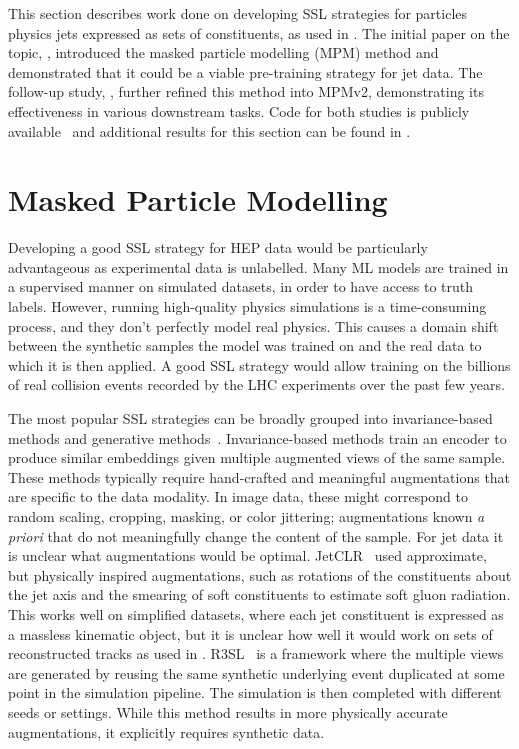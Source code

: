 This section describes work done on developing SSL strategies for particles physics jets expressed as sets of constituents, as used in .
The initial paper on the topic, \textcite{MPM}, introduced the masked particle modelling (MPM) method and demonstrated that it could be a viable pre-training strategy for jet data.
The follow-up study, \textcite{MPM2}, further refined this method into MPMv2, demonstrating its effectiveness in various downstream tasks.
Code for both studies is publicly available~\cite{MPMCode, MPM2Code} and additional results for this section can be found in .

\section{Masked Particle Modelling}

Developing a good SSL strategy for HEP data would be particularly advantageous as experimental data is unlabelled.
Many ML models are trained in a supervised manner on simulated datasets, in order to have access to truth labels.
However, running high-quality physics simulations is a time-consuming process, and they don't perfectly model real physics.
This causes a domain shift between the synthetic samples the model was trained on and the real data to which it is then applied.
A good SSL strategy would allow training on the billions of real collision events recorded by the LHC experiments over the past few years.

The most popular SSL strategies can be broadly grouped into invariance-based methods and generative methods~\cite{IJepa}.
Invariance-based methods train an encoder to produce similar embeddings given multiple augmented views of the same sample.
These methods typically require hand-crafted and meaningful augmentations that are specific to the data modality.
In image data, these might correspond to random scaling, cropping, masking, or color jittering; augmentations known \textit{a priori} that do not meaningfully change the content of the sample.
For jet data it is unclear what augmentations would be optimal.
JetCLR~\cite{JetCLR} used approximate, but physically inspired augmentations, such as rotations of the constituents about the jet axis and the smearing of soft constituents to estimate soft gluon radiation.
This works well on simplified datasets, where each jet constituent is expressed as a massless kinematic object, but it is unclear how well it would work on sets of reconstructed tracks as used in .
R3SL~\cite{ReSim} is a framework where the multiple views are generated by reusing the same synthetic underlying event duplicated at some point in the simulation pipeline.
The simulation is then completed with different seeds or settings.
While this method results in more physically accurate augmentations, it explicitly requires synthetic data.

